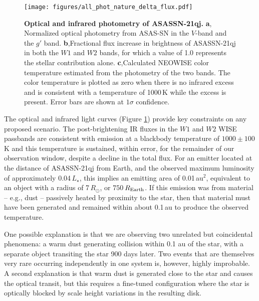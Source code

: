 \documentclass[sn-nature,oneside]{sn-jnl}%
\begin{document}
\begin{figure}
\centering
\texttt{[image: figures/all\_phot\_nature\_delta\_flux.pdf]}
\caption{\textbf{Optical and infrared photometry of ASASSN-21qj.}
%
{\bf a}, Normalized optical photometry from ASAS-SN in the $V$-band and the $g'$ band.
%
{\bf b},Fractional flux increase in brightness of ASASSN-21qj in both the $W1$ and $W2$ bands, for which a value of 1.0 represents the stellar contribution alone.
%
{\bf c},Calculated NEOWISE color temperature estimated from the photometry of the two bands.
%
The color temperature is plotted as zero when there is no infrared excess and is consistent with a temperature of 1000\,K while the excess is present.
%
Error bars are shown at $1\sigma$ confidence.
}
\label{fig:wisephot}
\end{figure}


The optical and infrared light curves (Figure \ref{fig:wisephot}) provide key constraints on any proposed scenario.
%
The post-brightening IR fluxes in the $W1$ and $W2$ WISE passbands are consistent with emission at a blackbody temperature of $1000 \pm 100$\,K and this temperature is sustained, within error, for the remainder of our observation window, despite a decline in the total flux.
%
For an emitter located at the distance of ASASSN-21qj from Earth, and the observed  maximum luminosity of approximately 0.04\,$L_\star$, this implies an emitting area of 0.01\,au$^2$, equivalent to an object with a radius of 7\,$R_\odot$, or $750$\,$R_{\rm Earth}$.
%
If this emission was from material -- e.g., dust -- passively heated by proximity to the star, then that material must have been generated and remained within about 0.1\,au to produce the observed temperature.


One possible explanation is that we are observing two unrelated but coincidental phenomena: a warm dust generating collision within 0.1 au of the star, with a separate object transiting the star 900 days later.
%
Two events that are themselves very rare occurring independently in one system is, however, highly improbable.
%
A second explanation is that warm dust is generated close to the star and causes the optical transit, but this requires a fine-tuned configuration where the star is optically blocked by scale height variations in the resulting disk.
\end{document}
